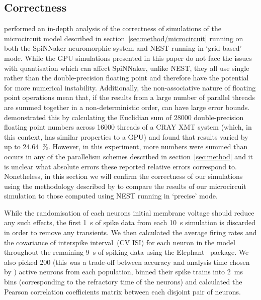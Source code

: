 \documentclass[utf8]{frontiersSCNS} %
\begin{document}
\subsection{Correctness}
\label{sec:results/correctness}
\citet{VanAlbada2018} performed an in-depth analysis of the correctness of simulations of the microcircuit model described in section~\ref{sec:method/microcircuit} running on both the SpiNNaker neuromorphic system and NEST running in `grid-based' mode.
While the GPU simulations presented in this paper do not face the issues with quantisation which can affect SpiNNaker, unlike NEST, they all use single rather than the double-precision floating point and therefore have the potential for more numerical instability.
Additionally, the non-associative nature of floating point operations mean that, if the results from a large number of parallel threads are summed together in a non-deterministic order, can have large error bounds.
\citet{Villa2009} demonstrated this by calculating the Euclidian sum of \num{28000} double-precision floating point numbers across \num{16000} threads of a CRAY XMT system (which, in this context, has similar properties to a GPU) and found that results varied by up to \SI{24.64}{\percent}.
However, in this experiment, more numbers were summed than occurs in any of the parallelism schemes described in section~\ref{sec:method} and it is unclear what absolute errors these reported relative errors correspond to.
Nonetheless, in this section we will confirm the correctness of our simulations using the methodology described by \citet{VanAlbada2018} to compare the results of our microcircuit simulation to those computed using NEST running in `precise' mode.

While the randomisation of each neurons initial membrane voltage should reduce any such effects, the first \SI{1}{\second} of spike data from each \SI{10}{\second} simulation is discarded in order to remove any transients.
We then calculated the average firing rates and the covariance of interspike interval~(CV ISI) for each neuron in the model throughout the remaining \SI{9}{\second} of spiking data using the Elephant~\citep{Yegenoglu2018} package.
We also picked \num{200} (this was a trade-off between accuracy and analysis time chosen by \citeauthor{VanAlbada2018}) active neurons from each population, binned their spike trains into \SI{2}{\milli\second} bins (corresponding to the refractory time of the neurons) and calculated the Pearson correlation coefficients matrix between each disjoint pair of neurons.
\end{document}
